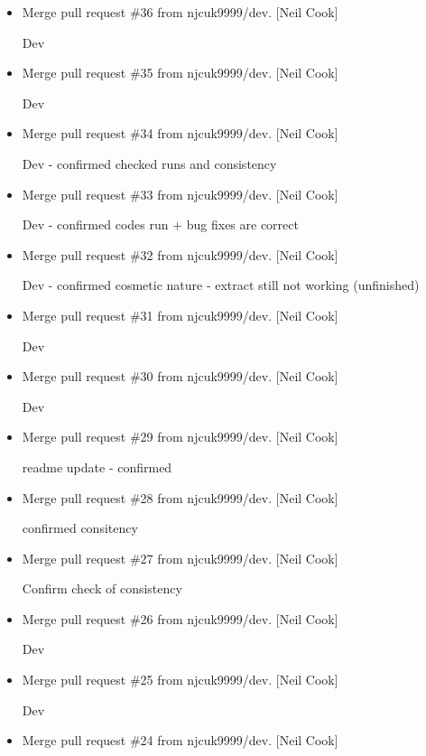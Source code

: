 \documentclass[a4paper,10pt,english]{report}
\begin{document}
\begin{itemize}
\item {} 
Merge pull request \#36 from njcuk9999/dev. {[}Neil Cook{]}

Dev

\item {} 
Merge pull request \#35 from njcuk9999/dev. {[}Neil Cook{]}

Dev

\item {} 
Merge pull request \#34 from njcuk9999/dev. {[}Neil Cook{]}

Dev - confirmed checked runs and consistency

\item {} 
Merge pull request \#33 from njcuk9999/dev. {[}Neil Cook{]}

Dev - confirmed codes run + bug fixes are correct

\item {} 
Merge pull request \#32 from njcuk9999/dev. {[}Neil Cook{]}

Dev - confirmed cosmetic nature - extract still not working (unfinished)

\item {} 
Merge pull request \#31 from njcuk9999/dev. {[}Neil Cook{]}

Dev

\item {} 
Merge pull request \#30 from njcuk9999/dev. {[}Neil Cook{]}

Dev

\item {} 
Merge pull request \#29 from njcuk9999/dev. {[}Neil Cook{]}

readme update - confirmed

\item {} 
Merge pull request \#28 from njcuk9999/dev. {[}Neil Cook{]}

confirmed consitency

\item {} 
Merge pull request \#27 from njcuk9999/dev. {[}Neil Cook{]}

Confirm check of consistency

\item {} 
Merge pull request \#26 from njcuk9999/dev. {[}Neil Cook{]}

Dev

\item {} 
Merge pull request \#25 from njcuk9999/dev. {[}Neil Cook{]}

Dev

\item {} 
Merge pull request \#24 from njcuk9999/dev. {[}Neil Cook{]}


\end{itemize}
\end{document}
